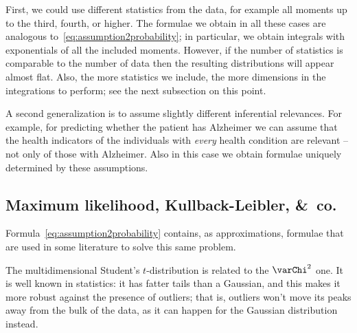 \documentclass[\ifafour a4paper,12pt,\else a5paper,10pt,\fi%
onecolumn,oneside,article,%
british%
]{memoir}
\theoremstyle{remark}
\theoremstyle{innote}
\newcommand*{\amp}{\&}
\newcommand*{\pf}{\mathrm{p}}%
\renewcommand*{\|}{\mathpunct{|}}
\newcommand*{\yH}{H}
\newcommand*{\yx}{x}
\newcommand*{\yxx}{\bm{\yx}}
\newcommand*{\data}{\text{data}}
\theoremstyle{plain}
\begin{document}
First, we could use different statistics from the data, for example all
moments up to the third, fourth, or higher. The formulae we obtain in all
these cases are analogous to~\eqref{eq:assumption2probability}; in
particular, we obtain integrals with exponentials of all the included
moments. However, if the number of statistics is comparable to the number
of data then the resulting distributions will appear almost flat. Also, the
more statistics we include, the more dimensions in the integrations to
perform; see the next subsection on this point.

A second generalization is to assume slightly different inferential
relevances. For example, for predicting whether the patient has Alzheimer
we can assume that the health indicators of the individuals with
\emph{every} health condition are relevant -- not only of those with
Alzheimer. Also in this case we obtain formulae uniquely determined by
these assumptions.





\subsection{Maximum likelihood, Kullback-Leibler, \amp\ co.}
\label{sec:max_likelihood}

Formula~\eqref{eq:assumption2probability} contains, as approximations,
formulae that are used in some literature to solve this same problem.

The multidimensional Student's $t$-distribution is related to the
$\varChi^2$ one. It is well known in statistics: it has fatter tails than
a Gaussian, and this makes it more robust against the presence of outliers;
that is, outliers won't move its peaks away from the bulk of the data, as
it can happen for the Gaussian distribution instead.
\end{document}
